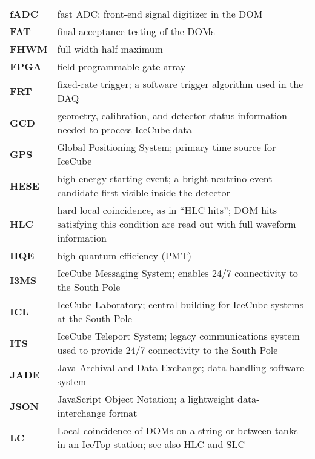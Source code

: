 \begin{longtable}{p{} p{}}
  \textbf{fADC} & fast ADC; front-end signal digitizer in the DOM \\
  
  \textbf{FAT} & final acceptance testing of the DOMs \\

  \textbf{FHWM} & full width half maximum \\

  \textbf{FPGA} & field-programmable gate array \\
  
  \textbf{FRT} & fixed-rate trigger; a software trigger algorithm used
  in the DAQ \\

  \textbf{GCD} & geometry, calibration, and detector status information
  needed to process IceCube data \\
  
  \textbf{GPS} & Global Positioning System; primary time source for IceCube
  \\

  \textbf{HESE} & high-energy starting event; a bright neutrino event
  candidate first visible inside the detector \\
  
  \textbf{HLC} & hard local coincidence, as in ``HLC hits'';
  DOM hits satisfying this condition are read out with full
  waveform information \\

  \textbf{HQE} & high quantum efficiency (PMT) \\

  \textbf{I3MS} & IceCube Messaging System; enables 24/7
  connectivity to the South Pole \\
  
  \textbf{ICL} & IceCube Laboratory; central building for IceCube systems
  at the South Pole \\

  \textbf{ITS} & IceCube Teleport System; legacy communications system used
  to provide 24/7 connectivity to the South Pole \\

  \textbf{JADE} & Java Archival and Data Exchange; data-handling software
  system \\

  \textbf{JSON} & JavaScript Object Notation; a lightweight
  data-interchange format \\
  
  \textbf{LC} & Local coincidence of DOMs on a string or between tanks in 
  an IceTop station; see also HLC and SLC \\
  

\end{longtable}
